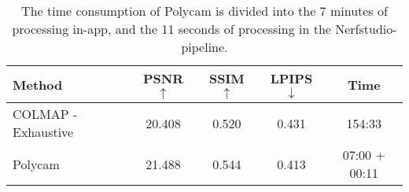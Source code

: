 \begin{table}[h]
\centering
\begin{tabular}{|lcccc|}
\hline
Method  & PSNR $\uparrow$ & SSIM $\uparrow$ & LPIPS $\downarrow$& Time  \\ \hline
COLMAP - Exhaustive         & 20.408    & 0.520    &  0.431     & 154:33     \\
Polycam                     & 21.488    & 0.544    & 0.413      & 07:00 + 00:11 \\
\hline
\end{tabular}
\caption{The time consumption of Polycam is divided into the 7 minutes of processing in-app, and the 11 seconds of processing in the Nerfstudio-pipeline. %
}
\label{tab:colmap-polycam-comparison}
\end{table}